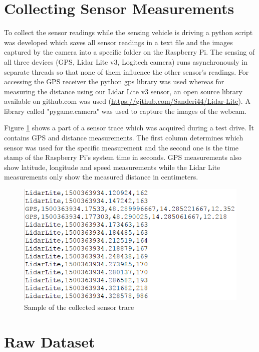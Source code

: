 \section{Collecting Sensor Measurements}

To collect the sensor readings while the sensing vehicle is driving a python script was developed which saves all sensor readings in a text file and the images captured by the camera into a specific folder on the Raspberry Pi. The sensing of all three devices (GPS, Lidar Lite v3, Logitech camera) runs asynchronously in separate threads so that none of them influence the other sensor's readings. For accessing the GPS receiver the python gps library was used whereas for measuring the distance using our Lidar Lite v3 sensor, an open source library available on github.com was used (\url{https://github.com/Sanderi44/Lidar-Lite}). A library called "pygame.camera" was used to capture the images of the webcam. 

Figure \ref{fig:sample_sensor_trace} shows a part of a sensor trace which was acquired during a test drive. It contains GPS and distance measurements. The first column determines which sensor was used for the specific measurement and the second one is the time stamp of the Raspberry Pi's system time in seconds. GPS measurements also show latitude, longitude and speed measurements while the Lidar Lite measurements only show the measured distance in centimeters.

\begin{figure}
	\centering
	\includegraphics{img/sample-sensor-trace.PNG}
	\caption{Sample of the collected sensor trace}
	\label{fig:sample_sensor_trace}
\end{figure}




\section{Raw Dataset}

